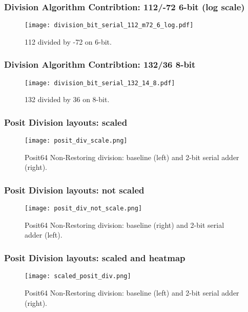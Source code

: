 \begin{frame}
	\frametitle{Division Algorithm Contribtion: 112/-72 6-bit (log scale)}

	\begin{figure}[H]
	        \centering
	        \texttt{[image: division\_bit\_serial\_112\_m72\_6\_log.pdf]}
		\caption{112 divided by -72 on 6-bit.}
	\end{figure}
\end{frame}

\begin{frame}
	\frametitle{Division Algorithm Contribtion: 132/36 8-bit}

	\begin{figure}[H]
	        \centering
	        \texttt{[image: division\_bit\_serial\_132\_14\_8.pdf]}
		\caption{132 divided by 36 on 8-bit.}
	\end{figure}
\end{frame}

\begin{frame}
    \frametitle{Posit Division layouts: scaled}
	\begin{figure}[H]
            \centering
            \texttt{[image: posit\_div\_scale.png]}
		\vspace{-2mm}
		\caption{Posit64 Non-Restoring division: baseline (left) and 2-bit serial adder (right).}
	\end{figure}
\end{frame}

\begin{frame}
    \frametitle{Posit Division layouts: not scaled}

	\begin{figure}[H]
	        \centering
	        \texttt{[image: posit\_div\_not\_scale.png]}
		\caption{Posit64 Non-Restoring division: baseline (right) and 2-bit serial adder (left).}
	\end{figure}
\end{frame}

\begin{frame}
    \frametitle{Posit Division layouts: scaled and heatmap}

	\begin{figure}[H]
	        \centering
	        \texttt{[image: scaled\_posit\_div.png]}
		\vspace{-2mm}
		\caption{Posit64 Non-Restoring division: baseline (left) and 2-bit serial adder (right).}
	\end{figure}
\end{frame}

